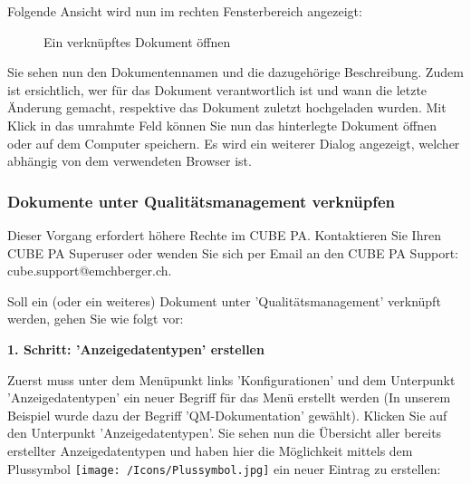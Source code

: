 Folgende Ansicht wird nun im rechten Fensterbereich angezeigt:

\vspace{6cm} 

\begin{figure}[H]
\caption{Ein verknüpftes Dokument öffnen}
\end{figure}

Sie sehen nun den Dokumentennamen und die dazugehörige Beschreibung. Zudem ist ersichtlich, wer für das Dokument verantwortlich ist und wann die letzte Änderung gemacht, respektive  das Dokument zuletzt hochgeladen wurden. Mit Klick in das umrahmte Feld können Sie nun das hinterlegte Dokument öffnen oder auf dem Computer speichern. Es wird ein weiterer Dialog angezeigt, welcher abhängig von dem verwendeten Browser ist.

\subsubsection{Dokumente unter Qualitätsmanagement verknüpfen}
\label{bkm:Ref912000789}

Dieser Vorgang erfordert höhere Rechte im CUBE PA. Kontaktieren Sie Ihren CUBE PA Superuser oder wenden Sie sich per Email an den CUBE PA Support: {\color{red} cube.support@emchberger.ch}.

\vspace{\baselineskip}

Soll ein (oder ein weiteres) Dokument unter 'Qualitätsmanagement' verknüpft werden, gehen Sie wie folgt vor:

\vspace{\baselineskip}

\textbf{1. Schritt: 'Anzeigedatentypen' erstellen}

Zuerst muss unter dem Menüpunkt links 'Konfigurationen' und dem Unterpunkt 'Anzeigedatentypen' ein neuer Begriff für das Menü erstellt werden (In unserem Beispiel wurde dazu der Begriff 'QM-Dokumentation' gewählt). Klicken Sie auf den Unterpunkt 'Anzeigedatentypen'. Sie sehen nun die Übersicht aller bereits erstellter Anzeigedatentypen und haben hier die Möglichkeit mittels dem Plussymbol \texttt{[image: /Icons/Plussymbol.jpg]}  ein neuer Eintrag zu erstellen:

